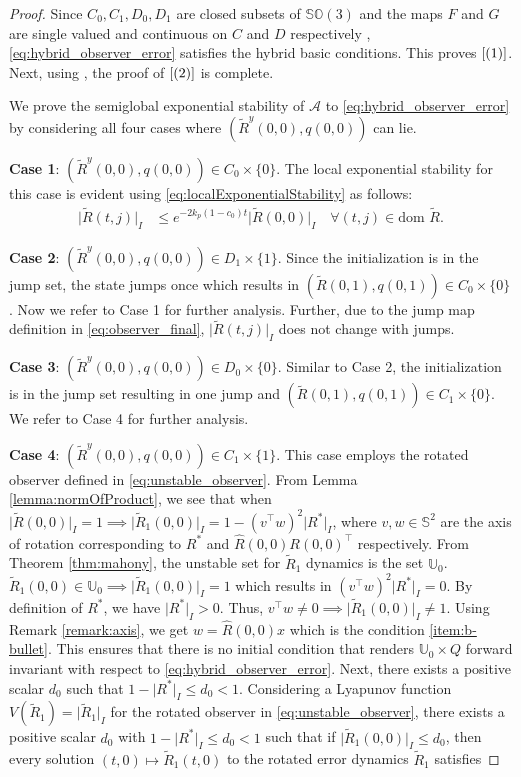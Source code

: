 \documentclass{article}
\newcommand{\dom}{\text{dom }}
\newcommand{\SOthree}{\mathbb{SO}(3)}
\newcommand{\Rtilde}{\tilde{R}}
\newcommand{\normSOthree}[1]{{{\vert}#1 {\vert}_I}}
\newcommand{\expo}[1]{e^{#1}}
\newcommand{\Rstar}{{R^*}}
\begin{document}
    \begin{proof}
    Since $C_0, C_1, D_0, D_1$ are closed subsets of ${\SOthree}$ and the maps $F$ and $G$ are single valued and continuous on $C$ and $D$ respectively , \eqref{eq:hybrid_observer_error} satisfies the hybrid basic conditions. This proves $\eqref{(1)}$. Next, using   \cite[Proposition 6.10]{hybridDynamicalSystems}, the proof of $\eqref{(2)}$ is complete. 

  We prove the semiglobal exponential stability of $\mathcal{A}$ to \eqref{eq:hybrid_observer_error} by considering all four cases where $(\Rtilde^y(0,0), q(0,0))$ can lie. 

\textbf{Case 1}: ${(\Rtilde^y(0,0), q(0,0))} \in C_0\times \{0\}$. The local exponential stability for this case is evident using \eqref{eq:localExponentialStability} as follows:
\begin{align}\label{eq:C0bounds}
    \normSOthree{\Rtilde(t,j)} &\leq \expo{-2k_p(1-c_0)t}\normSOthree{\Rtilde(0,0)} \quad \forall (t,j) \in \dom\Rtilde.
\end{align}

    \textbf{Case 2}: ${(\Rtilde^y(0,0), q(0,0))}\in D_1\times\{1\}$. Since the initialization is in the jump set, the state jumps once which results in ${(\Rtilde(0,1), q(0,1))}\in C_0\times \{0\}$. Now we refer to Case 1 for further analysis. Further, due to the jump map definition in \eqref{eq:observer_final}, $\normSOthree{\Rtilde(t,j)}$ does not change with jumps.

    \textbf{Case 3}: ${(\Rtilde^y(0,0), q(0,0))}\in D_0\times\{0\}$. Similar to Case 2, the initialization is in the jump set resulting in one jump and ${(\Rtilde(0,1), q(0,1))}\in C_1\times\{0\}$. We refer to Case 4 for further analysis.

\textbf{Case 4}: ${(\Rtilde^y(0,0), q(0,0))}\in C_1\times\{1\}$. This case employs the rotated observer defined in \eqref{eq:unstable_observer}. From Lemma \ref{lemma:normOfProduct}, we see that when  $\normSOthree{\Rtilde(0,0)}=1 \implies \normSOthree{\Rtilde_1(0,0)} = 1 - (v^\top w)^2\normSOthree{\Rstar}$, where $v, w\in\mathbb{S}^2$ are the axis of rotation corresponding to $\Rstar$ and $\hat{R}(0,0)R(0,0)^\top $ respectively. From Theorem \ref{thm:mahony}, the unstable set for $\Rtilde_1$ dynamics is the set $\mathbb{U}_0$. $\Rtilde_1(0,0)\in\mathbb{U}_0 \implies \normSOthree{\Rtilde_1(0,0)} = 1$ which results in $(v^\top w)^2\normSOthree{\Rstar} = 0$. By definition of $\Rstar$, we have $\normSOthree{\Rstar} > 0$. Thus, $v^\top w \neq 0 \implies \normSOthree{\Rtilde_1(0,0)} \neq 1$. Using Remark \ref{remark:axis}, we get $w = \hat{R}(0,0)x$ which is the condition \ref{item:b-bullet}. This ensures that there is no initial condition that renders $\mathbb{U}_0\times Q$ forward invariant with respect to \eqref{eq:hybrid_observer_error}. Next, there exists a positive scalar $d_0$ such that $1 - \normSOthree{\Rstar}\leq d_0 < 1$. Considering a Lyapunov function $V(\Rtilde_1) = \normSOthree{\Rtilde_1}$ for the rotated observer in \eqref{eq:unstable_observer}, there exists a positive scalar $d_0$ with $1 - \normSOthree{\Rstar} \leq d_0  < 1$ such that if $\normSOthree{\Rtilde_1(0,0)} \leq d_0$, then every solution $(t,0)\mapsto \Rtilde_1(t,0)$ to the rotated error dynamics $\Rtilde_1$  satisfies


\end{proof}
\end{document}
